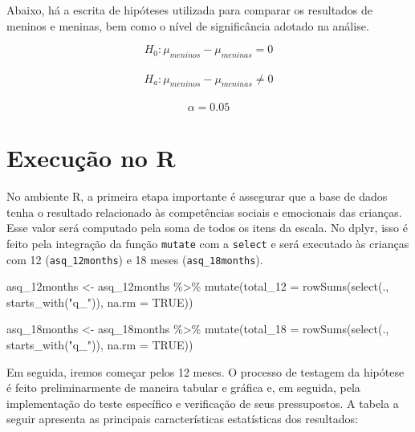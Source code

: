 \documentclass[
]{book}
\newenvironment{Shaded}{\begin{snugshade}}{\end{snugshade}}
\newcommand{\AttributeTok}[1]{\textcolor[rgb]{0.77,0.63,0.00}{#1}}
\newcommand{\ConstantTok}[1]{\textcolor[rgb]{0.00,0.00,0.00}{#1}}
\newcommand{\FunctionTok}[1]{\textcolor[rgb]{0.00,0.00,0.00}{#1}}
\newcommand{\NormalTok}[1]{#1}
\newcommand{\OtherTok}[1]{\textcolor[rgb]{0.56,0.35,0.01}{#1}}
\newcommand{\SpecialCharTok}[1]{\textcolor[rgb]{0.00,0.00,0.00}{#1}}
\newcommand{\StringTok}[1]{\textcolor[rgb]{0.31,0.60,0.02}{#1}}
\begin{document}
Abaixo, há a escrita de hipóteses utilizada para comparar os resultados de meninos e meninas, bem como o nível de significância adotado na análise.

\[H_0: \mu_{meninos} - \mu_{meninas} = 0\]\\
\[H_a: \mu_{meninos} - \mu_{meninas} \neq 0\]\\
\[\alpha = 0.05\]

\hypertarget{execuuxe7uxe3o-no-r-3}{%
\section{Execução no R}\label{execuuxe7uxe3o-no-r-3}}

No ambiente R, a primeira etapa importante é assegurar que a base de dados tenha o resultado relacionado às competências sociais e emocionais das crianças. Esse valor será computado pela soma de todos os itens da escala. No dplyr, isso é feito pela integração da função \texttt{mutate} com a \texttt{select} e será executado às crianças com 12 (\texttt{asq\_12months}) e 18 meses (\texttt{asq\_18months}).

\begin{Shaded}
\begin{Highlighting}[]
\NormalTok{asq\_12months }\OtherTok{\textless{}{-}}\NormalTok{ asq\_12months }\SpecialCharTok{\%\textgreater{}\%} 
  \FunctionTok{mutate}\NormalTok{(}\AttributeTok{total\_12 =} \FunctionTok{rowSums}\NormalTok{(}\FunctionTok{select}\NormalTok{(., }\FunctionTok{starts\_with}\NormalTok{(}\StringTok{"q\_"}\NormalTok{)), }
                            \AttributeTok{na.rm =} \ConstantTok{TRUE}\NormalTok{))}

\NormalTok{asq\_18months }\OtherTok{\textless{}{-}}\NormalTok{ asq\_18months }\SpecialCharTok{\%\textgreater{}\%} 
  \FunctionTok{mutate}\NormalTok{(}\AttributeTok{total\_18 =} \FunctionTok{rowSums}\NormalTok{(}\FunctionTok{select}\NormalTok{(., }\FunctionTok{starts\_with}\NormalTok{(}\StringTok{"q\_"}\NormalTok{)), }
                            \AttributeTok{na.rm =} \ConstantTok{TRUE}\NormalTok{))}
\end{Highlighting}
\end{Shaded}

Em seguida, iremos começar pelos 12 meses. O processo de testagem da hipótese é feito preliminarmente de maneira tabular e gráfica e, em seguida, pela implementação do teste específico e verificação de seus pressupostos. A tabela a seguir apresenta as principais características estatísticas dos resultados:
\end{document}
